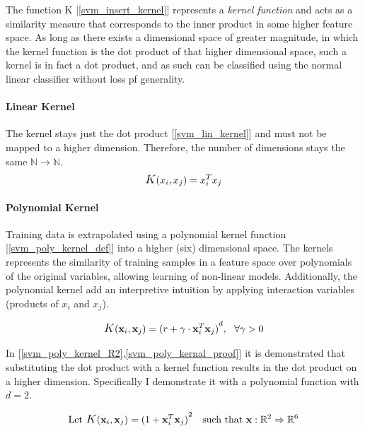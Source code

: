 	The function K [\ref{svm_insert_kernel}] represents a \textit{kernel function} and acts as a similarity measure that corresponds to the inner product in some higher feature space. As long as there exists a dimensional space of greater magnitude, in which the kernel function is the dot product of that higher dimensional space, such a kernel is in fact a dot product, and as such can be classified using the normal linear classifier without loss pf generality.
	
	\par	
\paragraph{Linear Kernel}
	The kernel stays just the dot product [\ref{svm_lin_kernel}] and must not be mapped to a higher dimension. Therefore, the number of dimensions stays the same $ \mathbb{N} \rightarrow \mathbb{N} $.
	\begin{equation}
		\mathlarger{K}(x_i,x_j) = x_i^T x_j
		\label{svm_lin_kernel}
	\end{equation}

\paragraph{Polynomial Kernel}
	Training data is extrapolated using a polynomial kernel function [\ref{svm_poly_kernel_def}] into a higher (six) dimensional space. The kernels represents the similarity of training samples in a feature space over polynomials of the original variables, allowing learning of non-linear models. Additionally, the polynomial kernel add an interpretive intuition by applying interaction variables (products of $ x_i $ and $ x_j $).
	
	\begin{equation}
		\begin{aligned}
			\mathlarger{K}(\textbf{x}_i,\textbf{x}_j) = {(r + \gamma \cdot \textbf{x}_i^T \textbf{x}_j)}^d, \ \ \forall \gamma > 0 
		\end{aligned}
	\label{svm_poly_kernel_def}
	\end{equation}
	
	In [\ref{svm_poly_kernel_R2},\ref{svm_poly_kernal_proof}] it is demonstrated that substituting the dot product with a kernel function results in the dot product on a higher dimension. Specifically I demonstrate it with a polynomial function with $ d=2 $.
	
	\begin{equation}
		\begin{aligned}
			&\text{Let   } \mathlarger{K}(\textbf{x}_i,\textbf{x}_j) = {(1 + \textbf{x}_i^T \textbf{x}_j)}^2 
			&\text{such that   } \textbf{x}: \mathbb{R}^2 \Rightarrow \mathbb{R}^6
		\end{aligned}
		\label{svm_poly_kernel_R2}
	\end{equation}
	
